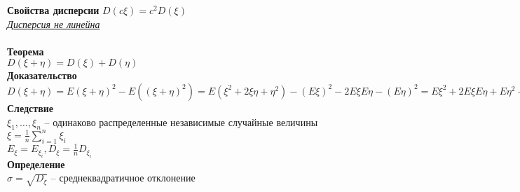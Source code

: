 \documentclass[12pt]{article}
\begin{document}
\textbf{Свойства дисперсии}
$D(c\xi) = c^2 D(\xi)$\\
\textit{\ul{Дисперсия не линейна}}\\\\
\textbf{Теорема}\\
$D(\xi + \eta) = D(\xi) + D(\eta)$\\
\textbf{Доказательство}\\
$D(\xi+\eta) = E(\xi+\eta)^2 - E((\xi+\eta)^2) = E(\xi^2 + 2\xi\eta + \eta^2) - (E\xi)^2 - 2E\xi E\eta - (E\eta)^2 = E\xi^2 + 2E\xi E\eta + E\eta^2 - (E\xi)^2 - 2E\xi E\eta - (E\eta)^2 = E\xi^2 - (E\xi)^2 + E\eta^2 - (E\eta)^2 = D(\xi) + D(\eta)$\\
\textbf{Следствие}\\
$\xi_1, \ldots, \xi_n$ -- одинаково распределенные независимые случайные величины\\
$\xi = \frac1n \sum_{i=1}^n \xi_i$\\
$E_\xi = E_{\xi_i}, D_\xi = \frac1n D_{\xi_i}$\\
\textbf{Определение}\\
$\sigma = \sqrt{D_\xi}$ -- среднеквадратичное отклонение
\end{document}
